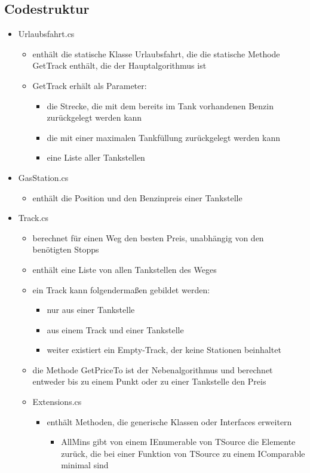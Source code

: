 \documentclass[a4paper,10pt,ngerman]{scrartcl}
\begin{document}
\subsection{Codestruktur}
\begin{itemize}
	\item Urlaubsfahrt.cs
	\begin{itemize}
		\item enthält die statische Klasse Urlaubsfahrt, die die statische Methode GetTrack enthält, die der Hauptalgorithmus ist
		\item GetTrack erhält als Parameter:
		 \begin{itemize}
		 	\item die Strecke, die mit dem bereits im Tank vorhandenen Benzin zurückgelegt werden kann
		 	\item die mit einer maximalen Tankfüllung zurückgelegt werden kann
		 	\item eine Liste aller Tankstellen
		\end{itemize}
	\end{itemize}
		\item GasStation.cs
	\begin{itemize}
		\item enthält die Position und den Benzinpreis einer Tankstelle
	\end{itemize}
		\item Track.cs
	\begin{itemize}
		\item berechnet für einen Weg den besten Preis, unabhängig von den benötigten Stopps
		\item enthält eine Liste von allen Tankstellen des Weges
		\item ein Track kann folgendermaßen gebildet werden:
		\begin{itemize}
			\item nur aus einer Tankstelle
			\item aus einem Track und einer Tankstelle
			\item weiter existiert ein Empty-Track, der keine Stationen beinhaltet
		\end{itemize}
			\item die Methode GetPriceTo ist der Nebenalgorithmus und berechnet entweder bis zu einem Punkt oder zu einer Tankstelle den Preis
			\item Extensions.cs
		\begin{itemize}
			\item enthält Methoden, die generische Klassen oder Interfaces erweitern
			\begin{itemize}
				\item AllMins gibt von einem IEnumerable von TSource die Elemente zurück, die bei einer Funktion von TSource zu einem IComparable minimal sind
			\end{itemize}
		\end{itemize}
		
	\end{itemize}
\end{itemize}
\end{document}
